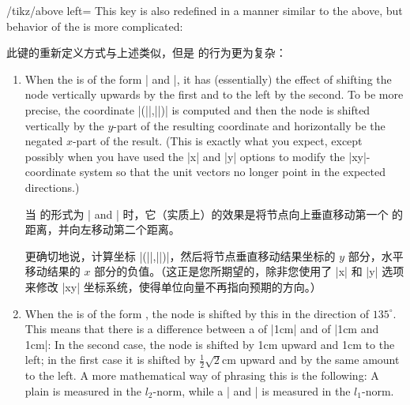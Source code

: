 \begin{key}{/tikz/above left=}
    This key is also redefined in a manner similar to the above, but behavior
    of the  is more complicated:
    
    此键的重新定义方式与上述类似，但是  的行为更为复杂：


    \begin{enumerate}
        \item When the  is of the form
            | and |, it has
            (essentially) the effect of shifting the node vertically upwards by
            the first  and to the left by the second.
            To be more precise, the coordinate |(||,||)| is computed and
            then the node is shifted vertically by the $y$-part of the
            resulting coordinate and horizontally be the negated $x$-part of
            the result. (This is exactly what you expect, except possibly when
            you have used the |x| and |y| options to modify the |xy|-coordinate
            system so that the unit  vectors no longer point in the expected
            directions.)

            当  的形式为 | and | 时，它（实质上）的效果是将节点向上垂直移动第一个  的距离，并向左移动第二个距离。

            更确切地说，计算坐标 |(||,||)|，然后将节点垂直移动结果坐标的 $y$ 部分，水平移动结果的 $x$ 部分的负值。（这正是您所期望的，除非您使用了 |x| 和 |y| 选项来修改 |xy| 坐标系统，使得单位向量不再指向预期的方向。）

        \item When the  is of the form , the node is shifted by this 
            in the direction of $135^\circ$. This means that there is a
            difference between a  of |1cm| and of
            |1cm and 1cm|: In the second case, the node is shifted by 1cm
            upward and 1cm to the left; in the first case it is shifted by
            $\frac{1}{2}\sqrt{2}$cm upward and by the same amount to the left.
            A more mathematical way of phrasing this is the following: A plain
             is measured in the $l_2$-norm, while a
            | and | is measured in the
            $l_1$-norm.


\end{enumerate}
\end{key}
